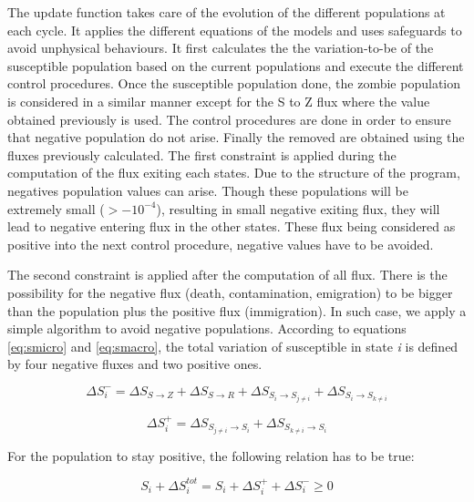 \documentclass[11pt]{article} %
\begin{document}
The update function takes care of the evolution of the different populations at each cycle. It applies the different equations of the models and uses safeguards to avoid unphysical behaviours. It first calculates the the variation-to-be of the susceptible population based on the current populations and execute the different control procedures. Once the susceptible population done, the zombie population is considered in a similar manner except for the S to Z flux where the value obtained previously is used. The control procedures are done in order to ensure that negative population do not arise. Finally the removed are obtained using the fluxes previously calculated.
The first constraint is applied during the computation of the flux exiting each states. Due to the structure of the program, negatives population values can arise. Though these populations will be extremely small ($> - 10^{-4}$), resulting in small negative exiting flux, they will lead to negative entering flux in the other states. These flux being considered as positive into the next control procedure, negative values have to be avoided.

The second constraint is applied after the computation of all flux. There is the possibility for the negative flux (death, contamination, emigration) to be bigger than the population plus the positive flux (immigration). In such case, we apply a simple algorithm to avoid negative populations. According to equations \eqref{eq:smicro} and \eqref{eq:smacro}, the total variation of susceptible in state \textit{i} is defined by four negative fluxes and two positive ones.

\bigskip
\begin{equation} \label{eq:delta-}
\Delta S_i^- = \Delta S_{S\rightarrow Z} + \Delta S_{S\rightarrow R} + \Delta S_{S_i\rightarrow S_{j\neq i}} + \Delta S_{S_i\rightarrow S_{k\neq i}}
\end{equation}

\begin{equation} \label{eq:delta+}
\Delta S_i^+ = \Delta S_{S_{j\neq i}\rightarrow S_i} + \Delta S_{S_{k\neq i}\rightarrow S_i}
\end{equation}
\bigskip

For the population to stay positive, the following relation has to be true:

\bigskip
\begin{equation} \label{eq:condition}
S_i + \Delta S_i^{tot} = S_i + \Delta S_i^+ + \Delta S_i^- \geq 0
\end{equation}
\bigskip
\end{document}
